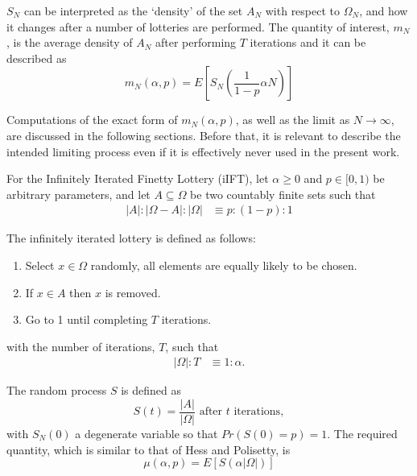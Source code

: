 \documentclass{article}
\newcommand{\card}[1]{\left| #1 \right|}
\begin{document}
$S_N$ can be interpreted as the `density' of the set $A_N$ with respect to $\Omega_N$, and how it changes after a number of lotteries are performed.
The quantity of interest, $m_N$, is the average density of $A_N$ after performing $T$ iterations and it can be described as
\begin{equation}
    m_N(\alpha, p) = E\left[ S_N\left( \frac{1}{1-p} \alpha N \right) \right]
\end{equation}

Computations of the exact form of $m_N(\alpha, p)$, as well as the limit as $N \rightarrow \infty$, are discussed in the following sections. 
Before that, it is relevant to describe the intended limiting process even if it is effectively never used in the present work.

 For the Infinitely Iterated Finetty Lottery (iIFT), let $\alpha\geq 0$ and $p\in [0,1)$ be arbitrary parameters, and let $A \subseteq \Omega$ be two countably finite sets such that 
\begin{align}
    \card{A} : \card{\Omega-A} : \card{\Omega} 
    &\equiv p: (1-p) : 1
\end{align}

The infinitely iterated lottery is defined as follows:
\begin{enumerate}
    \item Select $x\in \Omega$ randomly, all elements are equally likely to be chosen.
    \item If $x\in A$ then $x$ is removed.
    \item Go to 1 until completing $T$ iterations.
\end{enumerate}
with the number of iterations, $T$, such that
\begin{align}
    \card{\Omega} : T &\equiv 1:\alpha.
\end{align}

The random process $S$ is defined as
\begin{equation}
    S(t) = \frac{\card{A}}{\card{\Omega}} \text{ after } t \text{ iterations},
\end{equation}
with $S_N(0)$ a degenerate variable so that $Pr\left(S(0) =  p\right)=1$. The required quantity, which is similar to that of Hess and Polisetty, is 
\begin{equation}
    \mu(\alpha, p) = E\left[ S\left( \alpha \card{\Omega} \right) \right]
\end{equation}
\end{document}
